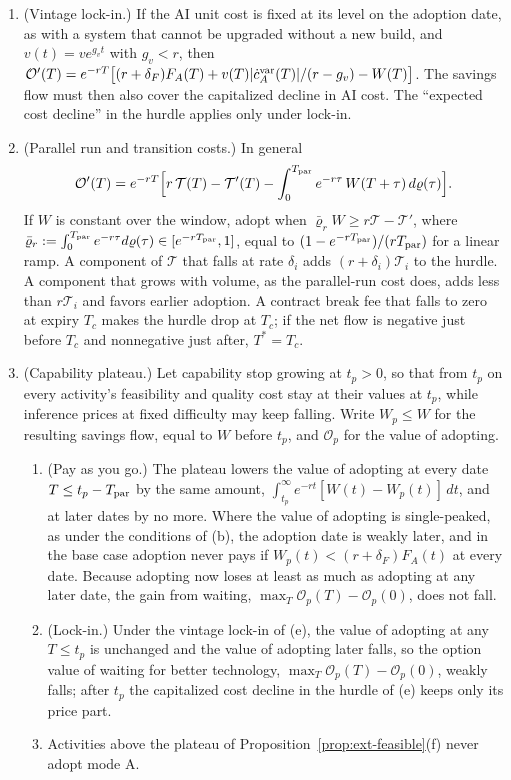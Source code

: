\begin{proposition}
\begin{enumerate}
\item[(e)] (Vintage lock-in.) If the AI unit cost is fixed at its level on the adoption date, as with a system that cannot be upgraded without a new build, and $v(t)=ve^{g_vt}$ with $g_v<r$, then $\mathcal O'(T)=e^{-rT}\bigl[(r+\delta_F)F_A(T)+v(T)|\dot c^{\rm var}_A(T)|/(r-g_v)-W(T)\bigr]$. The savings flow must then also cover the capitalized decline in AI cost. The ``expected cost decline'' in the hurdle applies only under lock-in.
\item[(f)] (Parallel run and transition costs.) In general
\begin{equation}\label{eq:ext-Opar}
\mathcal O'(T)=e^{-rT}\Bigl[r\,\mathcal T(T)-\mathcal T'(T)-\int_0^{T_{\rm par}}e^{-r\tau}\,W(T+\tau)\,d\varrho(\tau)\Bigr].
\end{equation}
If $W$ is constant over the window, adopt when $\bar\varrho_rW\ge r\mathcal T-\mathcal T'$, where $\bar\varrho_r:=\int_0^{T_{\rm par}}e^{-r\tau}d\varrho(\tau)\in[e^{-rT_{\rm par}},1]$, equal to $(1-e^{-rT_{\rm par}})/(rT_{\rm par})$ for a linear ramp. A component of $\mathcal T$ that falls at rate $\delta_i$ adds $(r+\delta_i)\mathcal T_i$ to the hurdle. A component that grows with volume, as the parallel-run cost does, adds less than $r\mathcal T_i$ and favors earlier adoption. A contract break fee that falls to zero at expiry $T_c$ makes the hurdle drop at $T_c$; if the net flow is negative just before $T_c$ and nonnegative just after, $T^*=T_c$.
\item[(g)] (Capability plateau.) Let capability stop growing at $t_p>0$, so that from $t_p$ on every activity's feasibility and quality cost stay at their values at $t_p$, while inference prices at fixed difficulty may keep falling. Write $W_p\le W$ for the resulting savings flow, equal to $W$ before $t_p$, and $\mathcal O_p$ for the value of adopting.
\begin{enumerate}
\item[(i)] (Pay as you go.) The plateau lowers the value of adopting at every date $T\le t_p-T_{\rm par}$ by the same amount, $\int_{t_p}^\infty e^{-rt}[W(t)-W_p(t)]\,dt$, and at later dates by no more. Where the value of adopting is single-peaked, as under the conditions of (b), the adoption date is weakly later, and in the base case adoption never pays if $W_p(t)<(r+\delta_F)F_A(t)$ at every date. Because adopting now loses at least as much as adopting at any later date, the gain from waiting, $\max_T\mathcal O_p(T)-\mathcal O_p(0)$, does not fall.
\item[(ii)] (Lock-in.) Under the vintage lock-in of (e), the value of adopting at any $T\le t_p$ is unchanged and the value of adopting later falls, so the option value of waiting for better technology, $\max_T\mathcal O_p(T)-\mathcal O_p(0)$, weakly falls; after $t_p$ the capitalized cost decline in the hurdle of (e) keeps only its price part.
\item[(iii)] Activities above the plateau of Proposition~\ref{prop:ext-feasible}(f) never adopt mode A.
\end{enumerate}
\end{enumerate}
\end{proposition}

